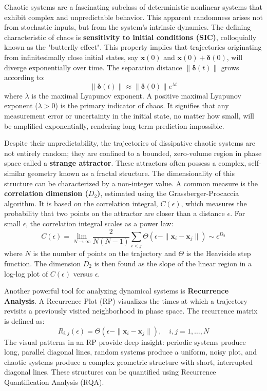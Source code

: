\documentclass[a4paper,12pt]{article}
\begin{document}
Chaotic systems are a fascinating subclass of deterministic nonlinear systems that exhibit complex and unpredictable behavior. This apparent randomness arises not from stochastic inputs, but from the system's intrinsic dynamics. The defining characteristic of chaos is \textbf{sensitivity to initial conditions (SIC)}, colloquially known as the "butterfly effect". This property implies that trajectories originating from infinitesimally close initial states, say $\mathbf{x}(0)$ and $\mathbf{x}(0) + \bm{\delta}(0)$, will diverge exponentially over time. The separation distance $\|\bm{\delta}(t)\|$ grows according to:
\begin{equation}
    \|\bm{\delta}(t)\| \approx \|\bm{\delta}(0)\| e^{\lambda t}
\end{equation}
where $\lambda$ is the maximal Lyapunov exponent. A positive maximal Lyapunov exponent ($\lambda > 0$) is the primary indicator of chaos. It signifies that any measurement error or uncertainty in the initial state, no matter how small, will be amplified exponentially, rendering long-term prediction impossible.

Despite their unpredictability, the trajectories of dissipative chaotic systems are not entirely random; they are confined to a bounded, zero-volume region in phase space called a \textbf{strange attractor}. These attractors often possess a complex, self-similar geometry known as a fractal structure. The dimensionality of this structure can be characterized by a non-integer value. A common measure is the \textbf{correlation dimension ($D_2$)}, estimated using the Grassberger-Procaccia algorithm. It is based on the correlation integral, $C(\epsilon)$, which measures the probability that two points on the attractor are closer than a distance $\epsilon$. For small $\epsilon$, the correlation integral scales as a power law:
\begin{equation}
    C(\epsilon) = \lim_{N \to \infty} \frac{2}{N(N-1)} \sum_{i<j} \Theta(\epsilon - \|\mathbf{x}_i - \mathbf{x}_j\|) \sim \epsilon^{D_2}
\end{equation}
where $N$ is the number of points on the trajectory and $\Theta$ is the Heaviside step function. The dimension $D_2$ is then found as the slope of the linear region in a log-log plot of $C(\epsilon)$ versus $\epsilon$.

Another powerful tool for analyzing dynamical systems is \textbf{Recurrence Analysis}. A Recurrence Plot (RP) visualizes the times at which a trajectory revisits a previously visited neighborhood in phase space. The recurrence matrix is defined as:
\begin{equation}
    R_{i,j}(\epsilon) = \Theta(\epsilon - \|\mathbf{x}_i - \mathbf{x}_j\|), \quad i,j = 1, \dots, N
\end{equation}
The visual patterns in an RP provide deep insight: periodic systems produce long, parallel diagonal lines, random systems produce a uniform, noisy plot, and chaotic systems produce a complex geometric structure with short, interrupted diagonal lines. These structures can be quantified using Recurrence Quantification Analysis (RQA).
\end{document}
